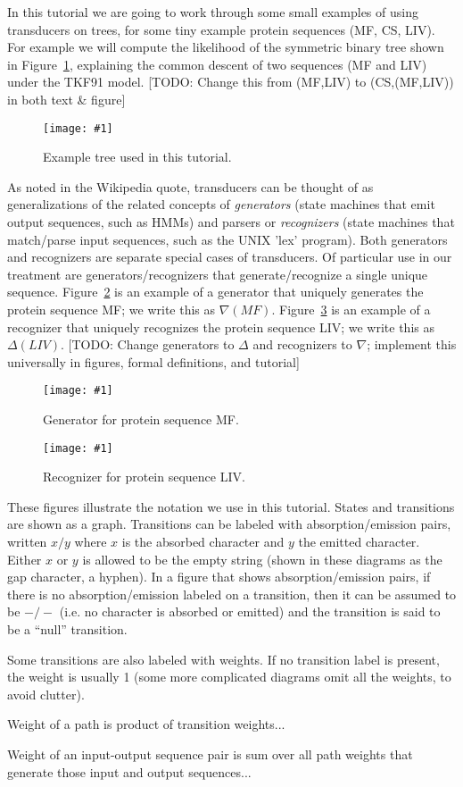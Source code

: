 \documentclass{article}
\newcommand{\figref}[1]{Figure~\ref{Figures.#1}}
\newcommand{\figlabel}[1]{\label{Figures.#1}}
\newcommand{\todo}[1]{[TODO: #1]}
\newcommand{\easyfig}[4]{
\begin{figure}
\texttt{[image: \#1]}
\caption{ \figlabel{#3} #4}
\end{figure}}
\newcommand{\pdffig}[2]{\easyfig{#1-fig.pdf}{}{#1}{#2}}
\begin{document}
In this tutorial we are going to work through some small examples of using transducers on trees,
for some tiny example protein sequences (MF, CS, LIV).
For example we will compute the likelihood of the symmetric binary tree shown in \figref{mf-liv-tree},
explaining the common descent of two sequences (MF and LIV)
under the TKF91 model.
\todo{Change this from (MF,LIV) to (CS,(MF,LIV)) in both text \& figure}
\pdffig{mf-liv-tree}{Example tree used in this tutorial.}

As noted in the Wikipedia quote, transducers can be thought of as generalizations of the related
concepts of {\em generators} (state machines that emit output sequences, such as HMMs)
and parsers or {\em recognizers} (state machines that match/parse input sequences, such as the UNIX 'lex' program).
Both generators and recognizers are separate special cases of transducers.
Of particular use in our treatment are generators/recognizers that generate/recognize a single unique sequence.
\figref{mf-generator} is an example of a generator that uniquely generates the protein sequence MF;
we write this as $\nabla(MF)$.
\figref{liv-small} is an example of a recognizer that uniquely recognizes the protein sequence LIV;
we write this as $\Delta(LIV)$.
\todo{Change generators to $\Delta$ and recognizers to $\nabla$;
 implement this universally in figures, formal definitions, and tutorial}

\pdffig{mf-generator}{Generator for protein sequence MF.}

\pdffig{liv-small}{Recognizer for protein sequence LIV.}

These figures illustrate the notation we use in this tutorial.
States and transitions are shown as a graph.
Transitions can be labeled with absorption/emission pairs,
written $x/y$ where $x$ is the absorbed character and $y$ the emitted character.
Either $x$ or $y$ is allowed to be the empty string (shown in these diagrams as the gap character, a hyphen).
In a figure that shows absorption/emission pairs,
if there is no absorption/emission labeled on a transition, then it can be assumed to be $-/-$
(i.e. no character is absorbed or emitted) and the transition is said to be a ``null'' transition.

Some transitions are also labeled with weights.
If no transition label is present, the weight is usually 1
(some more complicated diagrams omit all the weights, to avoid clutter).

Weight of a path is product of transition weights...

Weight of an input-output sequence pair is sum over all path weights that generate those input and output sequences...
\end{document}
